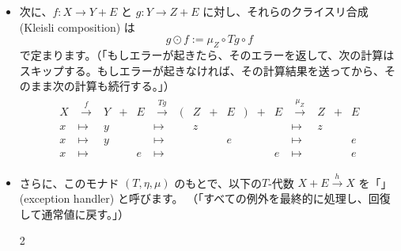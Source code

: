 \documentclass[
		head_space=20mm,
		foot_space=20mm,
		gutter=10mm,
		line_length=190mm
]{jlreq}
\begin{document}
\begin{oframed}
\begin{itemize}
\begin{itemize}
\begin{multicols}{2}
\begin{center}
			\end{center}
			\begin{center} \small
				$\left(\begin{array}{rl} \mu_X(inl (inl (x))) &:= inl(x)\\ \mu_X(inl(inr(e)))&:=inr(e)\\ \mu_X(inr(e)) &:= inr(e) \end{array}\right)$	
			\end{center}
		\end{multicols}
		\item このようにして、$(T,\eta,\mu)$ はモナドをなします。
	\end{itemize}
	\item 次に、$f: X\to Y+E$ と $g: Y\to Z+E$ に対し、それらのクライスリ合成 (Kleisli composition) は \[g\odot f:=\mu_Z\circ Tg\circ f\] で定まります。（「もしエラーが起きたら、そのエラーを返して、次の計算はスキップする。もしエラーが起きなければ、その計算結果を送ってから、そのまま次の計算も続行する。」）
	\begin{align*}
		\begin{array}{ccccccccccccccccc}
			X & \overset{f}{\;\longrightarrow\;} & Y&\!+\!&E& \overset{Tg}{\;\longrightarrow\;} & ({\!\!}&Z&\!+\!&E&{\!\!}) &\!+\!&E& \overset{\mu_Z}{\;\longrightarrow\;} & Z&\!+\!&E \\[2pt]
			x & \mapsto & y &&& \mapsto &&z &&&&&& \mapsto & z && \\[-2pt]
			x & \mapsto & y &&& \mapsto &&&& e &&&& \mapsto &&& e \\[-2pt]
			x & \mapsto &&& e & \mapsto &&&&&&& e & \mapsto &&& e
		\end{array}
	\end{align*}
	\item さらに、このモナド $(T,\eta,\mu)$ のもとで、以下の$T$-代数 $X+E\xrightarrow{h} X$ を「」(exception handler) と呼びます。%
	（「すべての例外を最終的に処理し、回復して通常値に戻す。」）
	\begin{multicols}{2}
		\begin{center}
\end{center}
\end{multicols}
\end{itemize}
\end{oframed}
\end{document}
